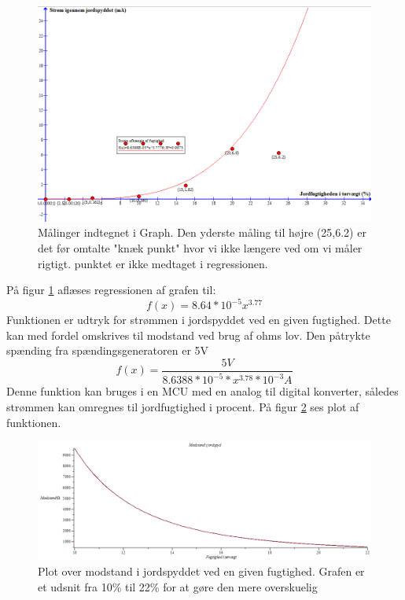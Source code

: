 \begin{figure}[H]
	\centering 
	\includegraphics[scale=0.6]{HardwareArkitektur/Sensore/Jordfugt_billeder/Graph_jordfugtighed.PNG}
	\caption{Målinger indtegnet i Graph. Den yderste måling til højre (25,6.2) er det før omtalte "knæk punkt" hvor vi ikke længere ved om vi måler rigtigt. punktet er ikke medtaget i regressionen.}
	\label{photo:Graph_jordfugtighed}
\end{figure}  

På figur \ref{photo:Graph_jordfugtighed} aflæses regressionen af grafen til:
$$f(x) = 8.64*10^{-5}x^{3.77} $$
Funktionen er udtryk for strømmen i jordspyddet ved en given fugtighed. Dette kan med fordel omskrives til modstand ved brug af ohms lov. Den påtrykte spænding fra spændingsgeneratoren er 5V
$$f(x) = \frac{5V}{{8.6388*10^{-5}*x^{3.78}*10^{-3}A}}$$
Denne funktion kan bruges i en MCU med en analog til digital konverter, således strømmen kan omregnes til jordfugtighed i procent. På figur \ref{photo:jordspyd_modstand} ses plot af funktionen. 

\begin{figure}[H]
	\centering 
	\includegraphics[scale=0.4]{HardwareArkitektur/Sensore/Jordfugt_billeder/jordspyd_modstand.PNG}
	\caption{Plot over modstand i jordspyddet ved en given fugtighed. Grafen er et udsnit fra 10\% til 22\% for at gøre den mere overskuelig}
	\label{photo:jordspyd_modstand}
\end{figure}  

